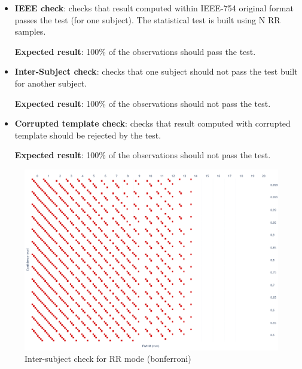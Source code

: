 \documentclass{article}
\begin{document}
\begin{itemize}
    \item \textbf{IEEE check}: checks that result computed within IEEE-754 original
          format passes the test (for one subject). The statistical test is built using N
          RR samples.

          \textbf{Expected result}: 100\% of the observations should pass the test.
    \item \textbf{Inter-Subject check}: checks that one subject should not pass the
          test built for another subject.

          \textbf{Expected result}: 100\% of the observations should not pass the test.

    \item \textbf{Corrupted template check}: checks that result computed with
          corrupted template should be rejected by the test.

          \textbf{Expected result}: 100\% of the observations should not pass the test.
\end{itemize}




\begin{figure}
    \centering
    \includegraphics[width=\linewidth]{figures/one_mct_fwe_bonferroni__RR.pdf}
    \caption{Inter-subject check for RR mode (bonferroni)}
\end{figure}
\end{document}
